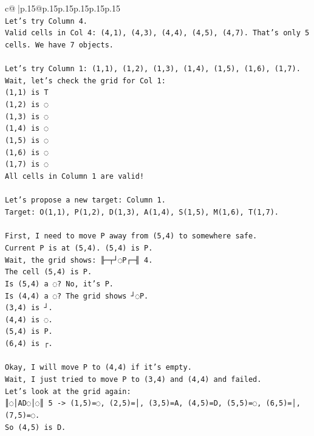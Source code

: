 \documentclass{article}
\begin{document}
{\begin{supertabular}{c@{$\;$}|p{.15\linewidth}@{}p{.15\linewidth}p{.15\linewidth}p{.15\linewidth}p{.15\linewidth}p{.15\linewidth}}
{{{\\ 
\texttt{Let's try Column 4.} \\
\texttt{Valid cells in Col 4: (4,1), (4,3), (4,4), (4,5), (4,7). That's only 5 cells. We have 7 objects.} \\
\\ 
\texttt{Let's try Column 1: (1,1), (1,2), (1,3), (1,4), (1,5), (1,6), (1,7).} \\
\texttt{Wait, let's check the grid for Col 1:} \\
\texttt{(1,1) is T} \\
\texttt{(1,2) is ◌} \\
\texttt{(1,3) is ◌} \\
\texttt{(1,4) is ◌} \\
\texttt{(1,5) is ◌} \\
\texttt{(1,6) is ◌} \\
\texttt{(1,7) is ◌} \\
\texttt{All cells in Column 1 are valid!} \\
\\ 
\texttt{Let's propose a new target: Column 1.} \\
\texttt{Target: O(1,1), P(1,2), D(1,3), A(1,4), S(1,5), M(1,6), T(1,7).} \\
\\ 
\texttt{First, I need to move P away from (5,4) to somewhere safe.} \\
\texttt{Current P is at (5,4). (5,4) is P.} \\
\texttt{Wait, the grid shows: ╟─┬┘◌P┌─╢ 4.} \\
\texttt{The cell (5,4) is P.} \\
\texttt{Is (5,4) a ◌? No, it's P.} \\
\texttt{Is (4,4) a ◌? The grid shows ┘◌P.} \\
\texttt{(3,4) is ┘.} \\
\texttt{(4,4) is ◌.} \\
\texttt{(5,4) is P.} \\
\texttt{(6,4) is ┌.} \\
\\ 
\texttt{Okay, I will move P to (4,4) if it's empty.} \\
\texttt{Wait, I just tried to move P to (3,4) and (4,4) and failed.} \\
\texttt{Let's look at the grid again:} \\
\texttt{║◌│AD◌│◌║ 5 {-}> (1,5)=◌, (2,5)=│, (3,5)=A, (4,5)=D, (5,5)=◌, (6,5)=│, (7,5)=◌.} \\
\texttt{So (4,5) is D.} \\
}}}
\end{supertabular}}
\end{document}
